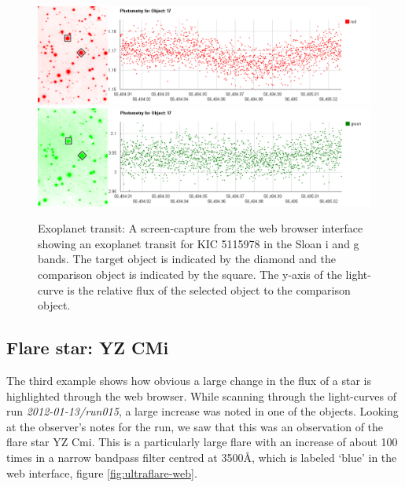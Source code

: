 \begin{figure}
\centering
\includegraphics[width=150mm]{images/koi823-r-lc.png}
\includegraphics[width=150mm]{images/koi823-g-lc.png}
\caption{Exoplanet transit: A screen-capture from the web browser interface showing an exoplanet transit for KIC 5115978 in the Sloan i and g bands. The target object is indicated by the diamond and the comparison object is indicated by the square. The y-axis of the light-curve is the relative flux of the selected object to the comparison object.}
\label{fig:koi823}
\end{figure}

\subsection{Flare star: YZ CMi}
The third example shows how obvious a large change in the flux of a star is highlighted through the web browser. While scanning through the light-curves of run \emph{2012-01-13/run015}, a large increase was noted in one of the objects. Looking at the observer's notes for the run, we saw that this was an observation of the flare star YZ Cmi. This is a particularly large flare with an increase of about 100 times in a narrow bandpass filter centred at 3500\AA, which is labeled `blue' in the web interface, figure \ref{fig:ultraflare-web}.  

